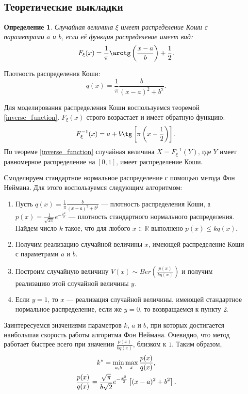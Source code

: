 \documentclass[11pt]{article}
\newtheorem{definition}{Определение}
\begin{document}
\subsection{Теоретические выкладки}
\begin{definition}
Случайная величина $\xi$ имеет распределение Коши с параметрами
$a$ и $b$, если её функция распределение имеет вид:
$$
F_{\xi}(x) = \frac{1}{\pi} \arctg \left( \frac{x-a}{b} \right) + \frac{1}{2}.
$$
\end{definition}
Плотность распределения Коши:
$$
q(x) = \frac{1}{\pi} \frac{b}{(x-a)^2+b^2}.
$$

Для моделирования распределения Коши воспользуемся теоремой \ref{inverse_function}. $F_{\xi}(x)$ строго возрастает и имеет обратную функцию:
$$
F_{\xi}^{-1}(x) = a + b \tg \left[ \pi \left( x - \frac{1}{2} \right) \right].
$$
По теореме \ref{inverse_function} случайная величина $X = F_{\xi}^{-1}(Y)$, где $Y$ имеет равномерное распределение на $[0, 1]$, имеет распределение Коши.

Смоделируем стандартное нормальное распределение с помощью метода Фон Неймана. Для этого воспользуемся следующим алгоритмом:
\begin{enumerate}
\item Пусть $q(x) = \tfrac{1}{\pi} \tfrac{b}{(x - a)^2 + b^2}$ — плотность распределения Коши, а $p(x) = \tfrac{1}{\sqrt{2\pi}} e^{-\tfrac{x^2}{2}}$ — плотность стандартного нормального распределения. Найдем число $k$ такое, что для любого $x \in \mathbb{R}$ выполнено $p(x) \leqslant kq(x)$.
\item Получим реализацию случайной величины $x$, имеющей распределение Коши с параметрами $a$ и $b$.
\item Построим случайную величину $V(x) \sim Ber\left( \tfrac{p(x)}{kq(x)} \right)$ и получим реализацию этой
случайной величины $y$.
\item Если $y = 1$, то $x$ --- реализация случайной величины, имеющей стандартное нормальное распределение, если же $y = 0$, то возвращаемся к пункту 2.
\end{enumerate}

Заинтересуемся значениями параметров $k$, $a$ и $b$, при которых достигается наибольшая скорость работы алгоритма Фон Неймана. Очевидно, что метод работает быстрее всего при значении $\tfrac{p(x)}{kq(x)}$, близком к $1$. Таким образом,
\begin{gather}
k^* = \min\limits_{a,b} \max\limits_x \frac{p(x)}{q(x)}, \notag \\
\frac{p(x)}{q(x)} = \frac{\sqrt{\pi}}{b\sqrt{2}} e^{-\frac{x^2}{2}} \left[ (x-a)^2 + b^2 \right]. \notag
\end{gather}
\end{document}
